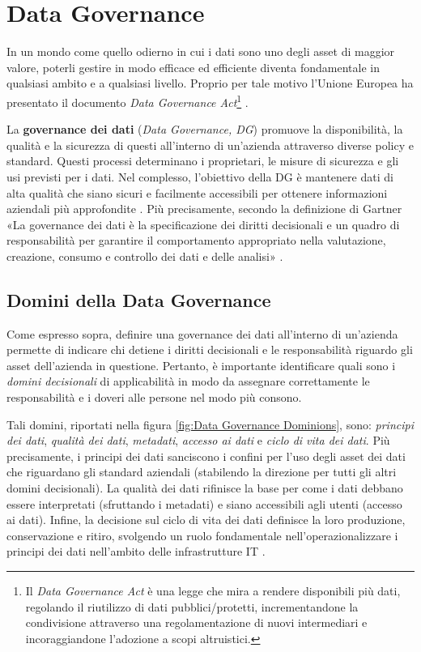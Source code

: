 \section{Data Governance}
In un mondo come quello odierno in cui i dati sono uno degli asset di maggior valore, poterli gestire in modo efficace ed efficiente diventa fondamentale in qualsiasi ambito e a qualsiasi livello. Proprio per tale motivo l'Unione Europea ha presentato il documento \textit{Data Governance Act}\footnote{Il \textit{Data Governance Act} è una legge che mira a rendere disponibili più dati, regolando il riutilizzo di dati pubblici/protetti, incrementandone la condivisione attraverso una regolamentazione di nuovi intermediari e incoraggiandone l'adozione a scopi altruistici.} \cite{europe_data_governance_act}.

La \textbf{governance dei dati} (\textit{Data Governance, DG}) promuove la disponibilità, la qualità e la sicurezza di questi all'interno di un'azienda attraverso diverse policy e standard. Questi processi determinano i proprietari, le misure di sicurezza e gli usi previsti per i dati. Nel complesso, l'obiettivo della DG è mantenere dati di alta qualità che siano sicuri e facilmente accessibili per ottenere informazioni aziendali più approfondite \cite{ibm_data_governance}.
Più precisamente, secondo la definizione di Gartner «La governance dei dati è la specificazione dei diritti decisionali e un quadro di responsabilità per garantire il comportamento appropriato nella valutazione, creazione, consumo e controllo dei dati e delle analisi» \cite{gartner_data_governance_definition}.

\subsection{Domini della Data Governance}
Come espresso sopra, definire una governance dei dati all'interno di un'azienda permette di indicare chi detiene i diritti decisionali e le responsabilità riguardo gli asset dell'azienda in questione. Pertanto, è importante identificare quali sono i \textit{domini decisionali} di applicabilità in modo da assegnare correttamente le responsabilità e i doveri alle persone nel modo più consono. 

Tali domini, riportati nella figura \ref{fig:Data Governance Dominions}, sono: \textit{principi dei dati}, \textit{qualità dei dati}, \textit{metadati}, \textit{accesso ai dati} e \textit{ciclo di vita dei dati}. Più precisamente, i principi dei dati sanciscono i confini per l'uso degli asset dei dati che riguardano gli standard aziendali (stabilendo la direzione per tutti gli altri domini decisionali). La qualità dei dati rifinisce la base per come i dati debbano essere interpretati (sfruttando i metadati) e siano accessibili agli utenti (accesso ai dati). Infine, la decisione sul ciclo di vita dei dati definisce la loro produzione, conservazione e ritiro, svolgendo un ruolo fondamentale nell'operazionalizzare i principi dei dati nell'ambito delle infrastrutture IT \cite{data_governance_activities}.


